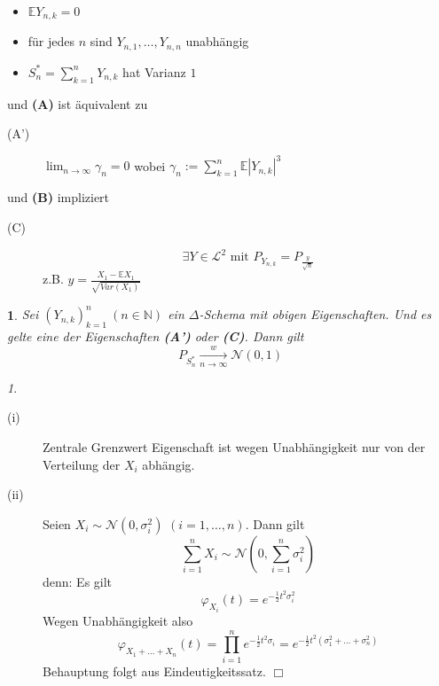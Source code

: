 \documentclass[10pt,a4paper]{report}
\numberwithin{equation}{section}
\numberwithin{figure}{section}
\theoremstyle{plain}
\theoremstyle{definition}
\theoremstyle{remark}
\newtheorem{rem}[thm]{\protect\remarkname}
\theoremstyle{plain}
\newtheorem{prop}[thm]{\protect\propositionname}
\providecommand{\propositionname}{Satz}
\providecommand{\remarkname}{Bemerkung}
\newcommand{\1}{ \mathbb{1} } %
\begin{document}
\begin{itemize}
\item $\mathbb{E}Y_{n,k}=0$
\item für jedes $n$ sind $Y_{n,1},\ldots,Y_{n,n}$ unabhängig 
\item $S_{n}^{*}=\sum_{k=1}^{n}Y_{n,k}$ hat Varianz $1$
\end{itemize}
und \textbf{(A)} ist äquivalent zu 
\begin{description}
\item [{(A')}] $\lim_{n\to\infty}\gamma_{n}=0$ wobei $\gamma_{n}:=\sum_{k=1}^{n}\mathbb{E}\left|Y_{n,k}\right|^{3}$ 
\end{description}
und \textbf{(B)} impliziert
\begin{description}
\item [{(C)}] 
\[
\exists Y\in\mathcal{L}^{2}\mbox{ mit }P_{Y_{n,k}}=P_{\frac{y}{\sqrt{n}}}
\]
z.B. $y=\frac{X_{1}-\mathbb{E}X_{1}}{\sqrt{Var\left(X_{1}\right)}}$ \end{description}
\begin{prop}
\label{prop:5.3}Sei $\left(Y_{n,k}\right)_{k=1}^{n}\ \left(n\in\mathbb{N}\right)$
ein $\varDelta$-Schema mit obigen Eigenschaften. Und es gelte eine
der Eigenschaften \textbf{(A')} oder \textbf{(C)}. Dann gilt 
\[
P_{S_{n}^{*}}\underset{n\to\infty}{\overset{w}{\longrightarrow}}\mathcal{N}\left(0,1\right)
\]
\end{prop}
\begin{rem}
 \ 
\begin{description}
\item [{(i)}] Zentrale Grenzwert Eigenschaft ist wegen Unabhängigkeit nur
von der Verteilung der $X_{i}$ abhängig. 
\item [{(ii)}] Seien $X_{i}\sim\mathcal{N}\left(0,\sigma_{i}^{2}\right)$
$\left(i=1,\ldots,n\right)$. Dann gilt 
\[
\sum_{i=1}^{n}X_{i}\sim\mathcal{N}\left(0,\sum_{i=1}^{n}\sigma_{i}^{2}\right)
\]
denn: Es gilt
\[
\varphi_{X_{i}}\left(t\right)=e^{-\frac{1}{2}t^{2}\sigma_{i}^{2}}
\]
Wegen Unabhängigkeit also
\[
\varphi_{X_{1}+\ldots+X_{n}}\left(t\right)=\prod_{i=1}^{n}e^{-\frac{1}{2}t^{2}\sigma_{i}}=e^{-\frac{1}{2}t^{2}\left(\sigma_{1}^{2}+\ldots+\sigma_{n}^{2}\right)}
\]
Behauptung folgt aus Eindeutigkeitssatz. \hfill $\Box$
\end{description}
\end{rem}
\end{document}
